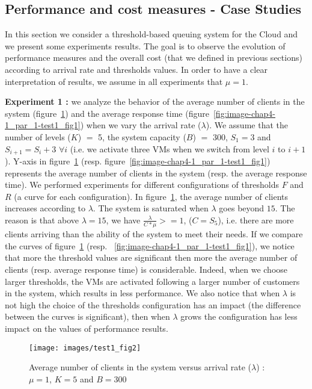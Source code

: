 \documentclass[conference]{IEEEtran}
\begin{document}
\subsection{Performance and cost measures - Case Studies}
\label{BBB}
In this section we consider a threshold-based queuing system for the Cloud and we present some experiments results. The goal is to observe the evolution of performance measures and the overall cost (that we defined in previous sections) according to arrival rate and thresholds values. In order to have a clear interpretation of results, we assume in all experiments that $\mu=1$. 

\textbf{Experiment 1 :} we analyze the behavior of the average number of clients in the system (figure~\ref{fig:image-chap4-1_par_1-test1_fig2}) and the average response time (figure~\ref{fig:image-chap4-1_par_1-test1_fig1}) when we vary the arrival rate ($\lambda$). We assume that the number of levels ($K$) $=$ 5, the system capacity ($B$) $=$ 300, $S_{1}=3$ and $S_{i+1}=S_{i}+3$ $\forall i$ (i.e. we activate three VMs when we switch from level $i$ to $i+1$). Y-axis in figure~\ref{fig:image-chap4-1_par_1-test1_fig2} (resp. figure~\ref{fig:image-chap4-1_par_1-test1_fig1}) represents the average number of clients in the system (resp. the average response time). We performed experiments for different configurations of thresholds $F$ and $R$ (a curve for each configuration). In figure~\ref{fig:image-chap4-1_par_1-test1_fig2}, the average number of clients increases according to $\lambda$. The system is saturated when $\lambda$ goes beyond $15$. The reason is that above $\lambda=15$, we have $\frac{\lambda}  {C*\mu} >= 1$, ($C=S_{5}$), i.e. there are more clients arriving than the ability of the system to meet their needs. If we compare the curves of figure~\ref{fig:image-chap4-1_par_1-test1_fig2} (resp. ~\ref{fig:image-chap4-1_par_1-test1_fig1}), we notice that more the threshold values are significant then more the average number of clients (resp. average response time) is considerable. Indeed, when we choose larger thresholds, the VMs are activated following a larger number of customers in the system, which results in less performance. We also notice that when $\lambda$ is not high the choice of the thresholds configuration has an impact (the difference between the curves is significant), then when $\lambda$ grows the configuration has less impact on the values of performance results.

\begin{figure}[!t]
\centering
\texttt{[image: images/test1\_fig2]}
\caption{Average number of clients in the system versus arrival rate ($\lambda$) : $\mu=1$, $K=5$ and $B=300$}
\label{fig:image-chap4-1_par_1-test1_fig2}
\end{figure}
\end{document}
